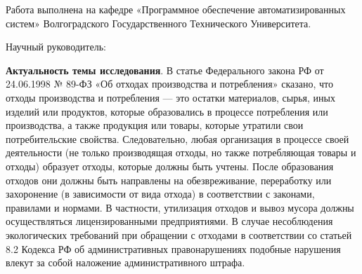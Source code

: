 \documentclass[a4paper]{G2-105}
\begin{document}
%
\VSTUInitializeAvtoreferat
%

\thispagestyle{empty}

Работа выполнена на кафедре «Программное обеспечение автоматизированных систем» Волгоградского Государственного Технического Университета.

Научный руководитель: \VSTUDirectorDegreeAndPost{} \VSTUDirectorFullName{}



\vfill


\newpage


\textbf{Актуальность темы исследования}.
В статье Федерального закона РФ от 24.06.1998 № 89-ФЗ «Об отходах производства и потребления» сказано, что отходы производства и потребления — это остатки материалов, сырья, иных изделий или продуктов, которые образовались в процессе потребления или производства, а также продукция или товары, которые утратили свои потребительские свойства. Следовательно, любая организация в процессе своей деятельности (не только производящая отходы, но также потребляющая товары и отходы) образует отходы, которые должны быть учтены. После образования отходов они должны быть направлены на обезвреживание, переработку или захоронение (в зависимости от вида отхода) в соответствии с законами, правилами и нормами. В частности, утилизация отходов и вывоз мусора должны осуществляться лицензированными предприятиями. В случае несоблюдения экологических требований при обращении с отходами в соответствии со статьей 8.2 Кодекса РФ об административных правонарушениях подобные нарушения влекут за собой наложение административного штрафа.
\end{document}
